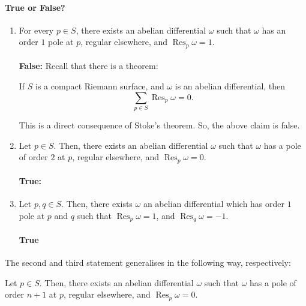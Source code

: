 \documentclass[a4paper]{report}
\theoremstyle{definition}
\theoremstyle{remark}
\theoremstyle{proposition}
\theoremstyle{conjecture}
\theoremstyle{lemma}
\theoremstyle{corollary}
\theoremstyle{exercise}
\theoremstyle{example}
\newcommand{\on}{\operatorname}
\begin{document}
\paragraph{True or False?}
\begin{enumerate}
    \item For every $p\in S$, there exists an abelian differential $\omega$
        such that $\omega$ has an order $1$ pole at $p$, regular elsewhere,
        and $\on{Res}_p\omega = 1$.\\\\
        \textbf{False:} Recall that there is a theorem:
        \begin{theorem}
            If $S$ is a compact Riemann surface, and $\omega$ is 
            an abelian differential, then $$\sum_{p\in S}\on{Res}_p\omega = 0.$$
        \end{theorem}
        This is a direct consequence of Stoke's theorem.
        So, the above claim is false.
    \item Let $p \in S$. Then, there exists an abelian differential $\omega$
        such that $\omega$ has a pole of order $2$ at $p$, regular elsewhere,
        and $\on{Res}_p\omega = 0$.
        \paragraph{True:}
    \item Let $p,q \in S$. Then, there exists $\omega$ an abelian differential 
        which has order $1$ pole at $p$ and $q$ such that $\on{Res}_p\omega=1$,
        and $\on{Res}_q\omega = -1$.\\
        \paragraph{True}
\end{enumerate}

The second and third statement generalises in the following way, respectively:

\begin{theorem}
Let $p \in S$. Then, there exists an abelian differential $\omega$
such that $\omega$ has a pole of order $n+1$ at $p$, regular elsewhere,
and $\on{Res}_p\omega = 0$.
\end{theorem}
\end{document}
